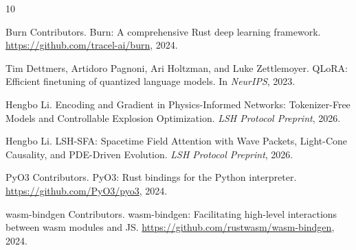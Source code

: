 \documentclass{article}
\begin{document}

\begin{thebibliography}{10}

Burn Contributors.
\newblock Burn: A comprehensive Rust deep learning framework.
\newblock \url{https://github.com/tracel-ai/burn}, 2024.

Tim Dettmers, Artidoro Pagnoni, Ari Holtzman, and Luke Zettlemoyer.
\newblock QLoRA: Efficient finetuning of quantized language models.
\newblock In \emph{NeurIPS}, 2023.

Hengbo Li.
\newblock Encoding and Gradient in Physics-Informed Networks: Tokenizer-Free Models and Controllable Explosion Optimization.
\newblock \emph{LSH Protocol Preprint}, 2026.

Hengbo Li.
\newblock LSH-SFA: Spacetime Field Attention with Wave Packets, Light-Cone Causality, and PDE-Driven Evolution.
\newblock \emph{LSH Protocol Preprint}, 2026.

PyO3 Contributors.
\newblock PyO3: Rust bindings for the Python interpreter.
\newblock \url{https://github.com/PyO3/pyo3}, 2024.

wasm-bindgen Contributors.
\newblock wasm-bindgen: Facilitating high-level interactions between wasm modules and JS.
\newblock \url{https://github.com/rustwasm/wasm-bindgen}, 2024.

\end{thebibliography}
\end{document}
